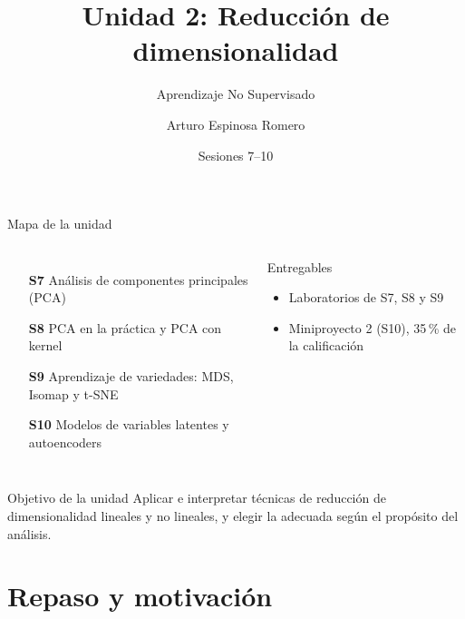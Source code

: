 \documentclass[aspectratio=169,11pt]{beamer}
\title[Unidad 2: Reducción de dimensionalidad]{Unidad 2: Reducción de dimensionalidad}
\subtitle{Aprendizaje No Supervisado}
\author[A. Espinosa Romero]{Arturo Espinosa Romero}
\institute[FMAT]{Maestría en Inteligencia Artificial \\ Facultad de Matemáticas}
\date{Sesiones 7--10}
\begin{document}
\begin{frame}
  \titlepage
\end{frame}

\begin{frame}{Mapa de la unidad}
  \begin{columns}[T]
    \begin{enumerate}
      \item[\textbf{S7}] Análisis de componentes principales (PCA)
      \item[\textbf{S8}] PCA en la práctica y PCA con kernel
      \item[\textbf{S9}] Aprendizaje de variedades: MDS, Isomap y t-SNE
      \item[\textbf{S10}] Modelos de variables latentes y autoencoders
    \end{enumerate}
    \begin{block}{Entregables}
      \begin{itemize}
        \item Laboratorios de S7, S8 y S9
        \item Miniproyecto 2 (S10), 35\,\% de la calificación
      \end{itemize}
    \end{block}
  \end{columns}
  \vspace{6pt}
  \begin{alertblock}{Objetivo de la unidad}
    Aplicar e interpretar técnicas de reducción de dimensionalidad lineales y no
    lineales, y elegir la adecuada según el propósito del análisis.
  \end{alertblock}
\end{frame}

\section{Repaso y motivación}
\end{document}
